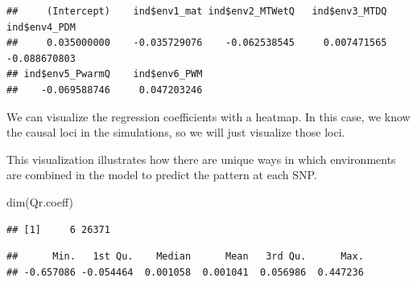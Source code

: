 \documentclass[
]{article}
\newenvironment{Shaded}{\begin{snugshade}}{\end{snugshade}}
\newcommand{\CommentTok}[1]{\textcolor[rgb]{0.56,0.35,0.01}{\textit{#1}}}
\newcommand{\FunctionTok}[1]{\textcolor[rgb]{0.00,0.00,0.00}{#1}}
\newcommand{\NormalTok}[1]{#1}
\newcommand{\OtherTok}[1]{\textcolor[rgb]{0.56,0.35,0.01}{#1}}
\newcommand{\SpecialCharTok}[1]{\textcolor[rgb]{0.00,0.00,0.00}{#1}}
\begin{document}
\begin{verbatim}
##     (Intercept)    ind$env1_mat ind$env2_MTWetQ   ind$env3_MTDQ    ind$env4_PDM 
##     0.035000000    -0.035729076    -0.062538545     0.007471565    -0.088670803 
## ind$env5_PwarmQ    ind$env6_PWM 
##    -0.069588746     0.047203246
\end{verbatim}

We can visualize the regression coefficients with a heatmap. In this
case, we know the causal loci in the simulations, so we will just
visualize those loci.

This visualization illustrates how there are unique ways in which
environments are combined in the model to predict the pattern at each
SNP.

\begin{Shaded}
\begin{Highlighting}[]
\FunctionTok{dim}\NormalTok{(Qr.coeff)}
\end{Highlighting}
\end{Shaded}

\begin{verbatim}
## [1]     6 26371
\end{verbatim}

\begin{Shaded}
\end{Shaded}

\begin{verbatim}
##      Min.   1st Qu.    Median      Mean   3rd Qu.      Max. 
## -0.657086 -0.054464  0.001058  0.001041  0.056986  0.447236
\end{verbatim}
\end{document}

